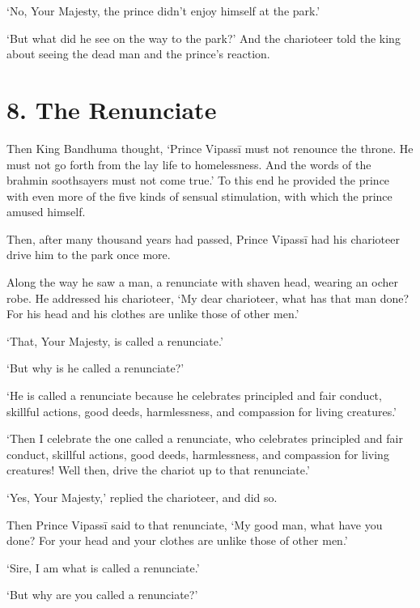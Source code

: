 \documentclass[12pt,openany]{book}%
\begin{document}
‘No, Your Majesty, the prince didn’t enjoy himself at the park.’ 

‘But what did he see on the way to the park?’ And the charioteer told the king about seeing the dead man and the prince’s reaction. 

\section*{8. The Renunciate }

Then King Bandhuma thought, ‘Prince \textsanskrit{Vipassī} must not renounce the throne. He must not go forth from the lay life to homelessness. And the words of the brahmin soothsayers must not come true.’ To this end he provided the prince with even more of the five kinds of sensual stimulation, with which the prince amused himself. 

Then, after many thousand years had passed, Prince \textsanskrit{Vipassī} had his charioteer drive him to the park once more. 

Along the way he saw a man, a renunciate with shaven head, wearing an ocher robe. He addressed his charioteer, ‘My dear charioteer, what has that man done? For his head and his clothes are unlike those of other men.’ 

‘That, Your Majesty, is called a renunciate.’ 

‘But why is he called a renunciate?’ 

‘He is called a renunciate because he celebrates principled and fair conduct, skillful actions, good deeds, harmlessness, and compassion for living creatures.’ 

‘Then I celebrate the one called a renunciate, who celebrates principled and fair conduct, skillful actions, good deeds, harmlessness, and compassion for living creatures! Well then, drive the chariot up to that renunciate.’ 

‘Yes, Your Majesty,’ replied the charioteer, and did so. 

Then Prince \textsanskrit{Vipassī} said to that renunciate, ‘My good man, what have you done? For your head and your clothes are unlike those of other men.’ 

‘Sire, I am what is called a renunciate.’ 

‘But why are you called a renunciate?’ 
\end{document}
